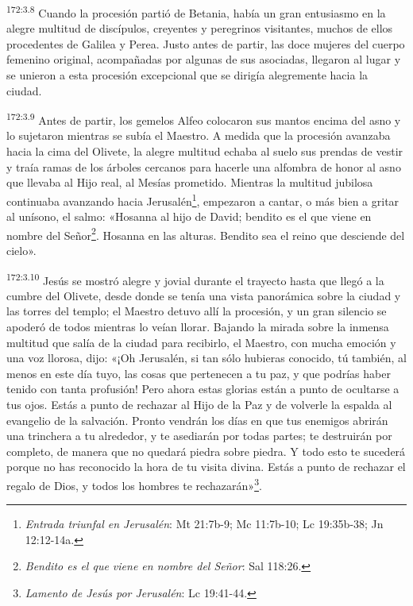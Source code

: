 \par 
\textsuperscript{172:3.8} Cuando la procesión partió de Betania, había un gran entusiasmo en la alegre multitud de discípulos, creyentes y peregrinos visitantes, muchos de ellos procedentes de Galilea y Perea. Justo antes de partir, las doce mujeres del cuerpo femenino original, acompañadas por algunas de sus asociadas, llegaron al lugar y se unieron a esta procesión excepcional que se dirigía alegremente hacia la ciudad.

\par 
\textsuperscript{172:3.9} Antes de partir, los gemelos Alfeo colocaron sus mantos encima del asno y lo sujetaron mientras se subía el Maestro. A medida que la procesión avanzaba hacia la cima del Olivete, la alegre multitud echaba al suelo sus prendas de vestir y traía ramas de los árboles cercanos para hacerle una alfombra de honor al asno que llevaba al Hijo real, al Mesías prometido. Mientras la multitud jubilosa continuaba avanzando hacia Jerusalén\footnote{\textit{Entrada triunfal en Jerusalén}: Mt 21:7b-9; Mc 11:7b-10; Lc 19:35b-38; Jn 12:12-14a.}, empezaron a cantar, o más bien a gritar al unísono, el salmo: «Hosanna al hijo de David; bendito es el que viene en nombre del Señor\footnote{\textit{Bendito es el que viene en nombre del Señor}: Sal 118:26.}. Hosanna en las alturas. Bendito sea el reino que desciende del cielo».

\par 
\textsuperscript{172:3.10} Jesús se mostró alegre y jovial durante el trayecto hasta que llegó a la cumbre del Olivete, desde donde se tenía una vista panorámica sobre la ciudad y las torres del templo; el Maestro detuvo allí la procesión, y un gran silencio se apoderó de todos mientras lo veían llorar. Bajando la mirada sobre la inmensa multitud que salía de la ciudad para recibirlo, el Maestro, con mucha emoción y una voz llorosa, dijo: «¡Oh Jerusalén, si tan sólo hubieras conocido, tú también, al menos en este día tuyo, las cosas que pertenecen a tu paz, y que podrías haber tenido con tanta profusión! Pero ahora estas glorias están a punto de ocultarse a tus ojos. Estás a punto de rechazar al Hijo de la Paz y de volverle la espalda al evangelio de la salvación. Pronto vendrán los días en que tus enemigos abrirán una trinchera a tu alrededor, y te asediarán por todas partes; te destruirán por completo, de manera que no quedará piedra sobre piedra. Y todo esto te sucederá porque no has reconocido la hora de tu visita divina. Estás a punto de rechazar el regalo de Dios, y todos los hombres te rechazarán»\footnote{\textit{Lamento de Jesús por Jerusalén}: Lc 19:41-44.}.

